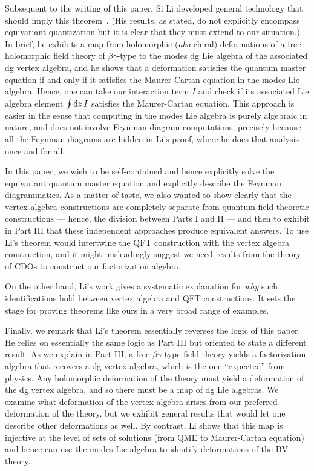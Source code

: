 \begin{rmk}
\label{rmk on si's work}
Subsequent to the writing of this paper, 
Si Li developed general technology that should imply this theorem~\cite{LiQME}.
(His results, as stated, do not explicitly encompass equivariant quantization but it is clear that they must  extend to our situation.)
In brief, he exhibits a map from holomorphic ({\em aka} chiral) deformations of a free holomorphic field theory of $\beta\gamma$-type to the modes dg Lie algebra of the associated dg vertex algebra,
and he shows that a deformation satisfies the quantum master equation if and only if it satisfies the Maurer-Cartan equation in the modes Lie algebra.
Hence, one can take our interaction term $I$ and check if its associated Lie algebra element $\oint {\rm d} z\, I$ satisfies the Maurer-Cartan equation.
This approach is easier in the sense that computing in the modes Lie algebra is purely algebraic in nature,
and does not involve Feynman diagram computations,
precisely because all the Feynman diagrams are hidden in Li's proof, where he does that analysis once and for all.

In this paper, we wish to be self-contained and hence explicitly solve the equivariant quantum master equation and explicitly describe the Feynman diagrammatics.
As a matter of taste, we also wanted to show clearly that the vertex algebra constructions are completely separate from quantum field theoretic constructions --- hence, the division between Parts I and II --- and then to exhibit  in Part III that these independent approaches produce equivalent answers.
To use Li's theorem would intertwine the QFT construction with the vertex algebra construction,
and it might misleadingly suggest we need results from the theory of CDOs to construct our factorization algebra.

On the other hand, Li's work gives a systematic explanation for {\em why} such identifications hold between vertex algebra and QFT constructions.
It sets the stage for proving theorems like ours in a very broad range of examples.

Finally, we remark that Li's theorem essentially reverses the logic of this paper.
He relies on essentially the same logic as Part III but oriented to state a different result.
As we explain in Part III, a free $\beta\gamma$-type field theory yields a factorization algebra that recovers a dg vertex algebra, which is the one ``expected'' from physics.
Any holomorphic deformation of the theory must yield a deformation of the dg vertex algebra, 
and so there must be a map of dg Lie algebras.
We examine what deformation of the vertex algebra arises from our preferred deformation of the theory,
but we exhibit general results that would let one describe other deformations as well.
By contrast, Li shows that this map is injective at the level of sets of solutions (from QME to Maurer-Cartan equation) and hence can use the modes Lie algebra to identify deformations of the BV theory.
\end{rmk}


